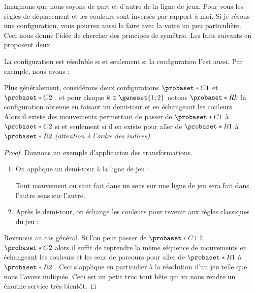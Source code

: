 Imaginons que nous soyons de part et d'autre de la ligne de jeux.
Pour vous les règles de déplacement et les couleurs sont inversés par rapport à moi.
Si je résous une configuration, vous pourrez aussi la faire avec la votre un peu particulière.
Ceci nous donne l'idée de chercher des principes de symétrie. Les faits suivants en proposent deux.



\begin{fact} \label{symmetry-color}
	La configuration  est résoluble si et seulement si la configuration  l'est aussi. 
	Par exemple, nous avons :
	
	
	\medskip
	
	Plus généralement, considérons deux configurations $\probaset*{C}{1}$ et $\probaset*{C}{2}$ , et pour chaque $k \in \geneset{1 ; 2}$ notons $\probaset*{R}{k}$ la configuration obtenue en faisant un demi-tour et en échangeant les couleurs.
	Alors il existe des mouvements permettant de passer de $\probaset*{C}{1}$ à $\probaset*{C}{2}$ si et seulement si il en existe pour aller de $\probaset*{R}{1}$ à $\probaset*{R}{2}$ \emph{(attention à l'ordre des indices)}.  
\end{fact}


\begin{proof}
	Donnons un exemple d'application des transformations.
	\begin{enumerate}
		\item On applique un demi-tour à la ligne de jeu :
		
		\noindent
		Tout mouvement ou saut fait dans un sens sur une ligne de jeu sera fait dans l'autre sens sur l'autre.

		\item Après le demi-tour, on échange les couleurs pour revenir aux règles classiques du jeu :
	\end{enumerate}
	
	Revenons au cas général.
	Si l'on peut passer de $\probaset*{C}{1}$ à $\probaset*{C}{2}$ alors il suffit de reprendre la même séquence de mouvements en échangeant les couleurs et les sens de parcours pour aller de $\probaset*{R}{1}$ à $\probaset*{R}{2}$ .
	Ceci s'applique en particulier à la résolution d'un jeu telle que nous l'avons indiquée. 
	Ceci est un petit truc tout bête qui va nous rendre un énorme service très bientôt.
\end{proof}


